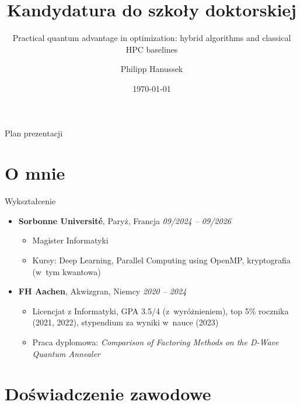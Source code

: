 \documentclass[aspectratio=169]{beamer}
\title[Kandydatura doktorancka]{Kandydatura do szkoły doktorskiej}
\subtitle{Practical quantum advantage in optimization: hybrid algorithms and classical HPC baselines}
\author{Philipp Hanussek}
\institute{IITiS PAN, Gliwice \\ Promotor: dr hab. inż. Łukasz Pawela}
\date{\today}
\begin{document}
\begin{frame}[plain]
	\titlepage
\end{frame}

\begin{frame}{Plan prezentacji}
	\tableofcontents
\end{frame}

\section{O mnie}

\begin{frame}
\end{frame}

\begin{frame}{Wykształcenie}
	\begin{itemize}
		\item \textbf{Sorbonne Université}, Paryż, Francja \hfill \textit{09/2024 -- 09/2026}
		      \begin{itemize}
			      \item Magister Informatyki
			      \item Kursy: Deep Learning, Parallel Computing using OpenMP, kryptografia (w~tym kwantowa)
		      \end{itemize}
		\item \textbf{FH Aachen}, Akwizgran, Niemcy \hfill \textit{2020 -- 2024}
		      \begin{itemize}
			      \item Licencjat z Informatyki, GPA 3.5/4 (z~wyróżnieniem), top 5\% rocznika (2021, 2022), stypendium za wyniki w~nauce (2023)
			      \item Praca dyplomowa: \textit{Comparison of Factoring Methods on the D-Wave Quantum Annealer}
		      \end{itemize}
	\end{itemize}
\end{frame}

\section{Doświadczenie zawodowe}
\end{document}
